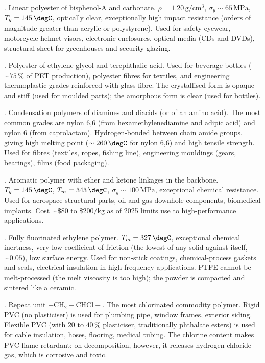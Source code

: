 . Linear polyester of bisphenol-A and
carbonate. $\rho = 1.20\,\text{g}/\text{cm}^3$, $\sigma_y \sim 65\,
\text{MPa}$, $T_g = 145\,\degC$, optically clear, exceptionally
high impact resistance (orders of magnitude greater than acrylic or
polystyrene). Used for safety eyewear, motorcycle helmet visors,
electronic enclosures, optical media (CDs and DVDs), structural
sheet for greenhouses and security glazing.

. Polyester of ethylene
glycol and terephthalic acid. Used for beverage bottles ($\sim 75\,\%$
of PET production), polyester fibres for textiles, and engineering
thermoplastic grades reinforced with glass fibre. The crystallised
form is opaque and stiff (used for moulded parts); the amorphous form
is clear (used for bottles).

. Condensation polymers of diamines and
diacids (or of an amino acid). The most common grades are nylon 6,6
(from hexamethylenediamine and adipic acid) and nylon 6 (from
caprolactam). Hydrogen-bonded between chain amide groups, giving high
melting point ($\sim 260\,\degC$ for nylon 6,6) and high tensile
strength. Used for fibres (textiles, ropes, fishing line), engineering
mouldings (gears, bearings), films (food packaging).

. Aromatic polymer with ether and
ketone linkages in the backbone. $T_g = 145\,\degC$, $T_m = 343\,\degC$,
$\sigma_y \sim 100\,\text{MPa}$, exceptional chemical resistance.
Used for aerospace structural parts, oil-and-gas downhole components,
biomedical implants. Cost $\sim \$80$ to $\$200/\text{kg}$ as of 2025
limits use to high-performance applications.

. Fully fluorinated
ethylene polymer. $T_m = 327\,\degC$, exceptional chemical inertness,
very low coefficient of friction (the lowest of any solid against
itself, $\sim 0.05$), low surface energy. Used for non-stick coatings,
chemical-process gaskets and seals, electrical insulation in
high-frequency applications. PTFE cannot be melt-processed (the melt
viscosity is too high); the powder is compacted and sintered like a
ceramic.

. Repeat unit $-\text{CH}_2-\text{CHCl}-$.
The most chlorinated commodity polymer. Rigid PVC (no plasticiser) is
used for plumbing pipe, window frames, exterior siding. Flexible PVC
(with $20$ to $40\,\%$ plasticiser, traditionally phthalate esters) is
used for cable insulation, hoses, flooring, medical tubing. The
chlorine content makes PVC flame-retardant; on decomposition, however,
it releases hydrogen chloride gas, which is corrosive and toxic.

